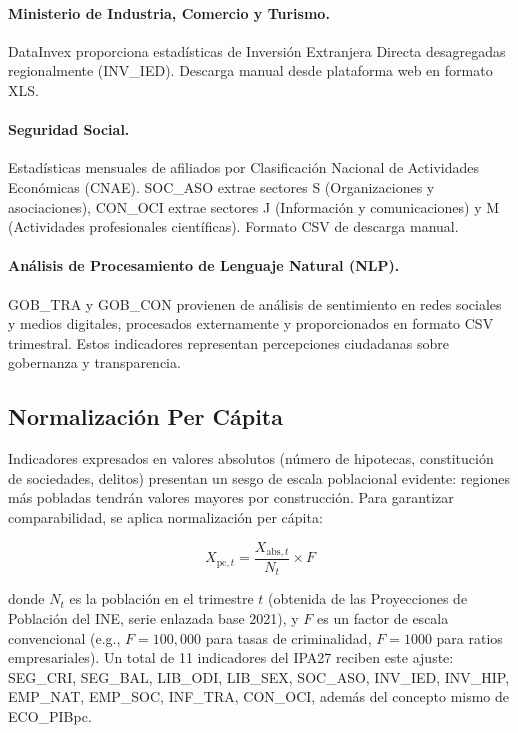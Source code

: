 \documentclass[authoryear,12pt]{elsarticle}
\begin{document}
\paragraph{Ministerio de Industria, Comercio y Turismo.} DataInvex proporciona estadísticas de Inversión Extranjera Directa desagregadas regionalmente (INV\_IED). Descarga manual desde plataforma web en formato XLS.

\paragraph{Seguridad Social.} Estadísticas mensuales de afiliados por Clasificación Nacional de Actividades Económicas (CNAE). SOC\_ASO extrae sectores S (Organizaciones y asociaciones), CON\_OCI extrae sectores J (Información y comunicaciones) y M (Actividades profesionales científicas). Formato CSV de descarga manual.

\paragraph{Análisis de Procesamiento de Lenguaje Natural (NLP).} GOB\_TRA y GOB\_CON provienen de análisis de sentimiento en redes sociales y medios digitales, procesados externamente y proporcionados en formato CSV trimestral. Estos indicadores representan percepciones ciudadanas sobre gobernanza y transparencia.

\subsection{Normalización Per Cápita}

Indicadores expresados en valores absolutos (número de hipotecas, constitución de sociedades, delitos) presentan un sesgo de escala poblacional evidente: regiones más pobladas tendrán valores mayores por construcción. Para garantizar comparabilidad, se aplica normalización per cápita:

\begin{equation}
X_{\text{pc}, t} = \frac{X_{\text{abs}, t}}{N_t} \times F
\end{equation}

donde $N_t$ es la población en el trimestre $t$ (obtenida de las Proyecciones de Población del INE, serie enlazada base 2021), y $F$ es un factor de escala convencional (e.g., $F = 100{,}000$ para tasas de criminalidad, $F = 1000$ para ratios empresariales). Un total de 11 indicadores del IPA27 reciben este ajuste: SEG\_CRI, SEG\_BAL, LIB\_ODI, LIB\_SEX, SOC\_ASO, INV\_IED, INV\_HIP, EMP\_NAT, EMP\_SOC, INF\_TRA, CON\_OCI, además del concepto mismo de ECO\_PIBpc.
\end{document}
